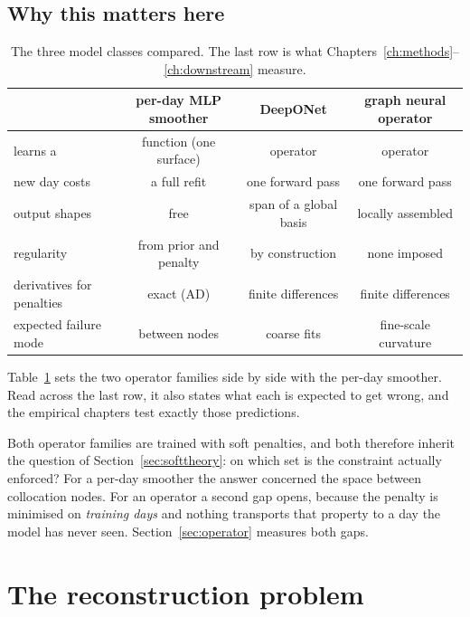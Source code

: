 \subsection{Why this matters here}

\begin{table}[htbp]\centering\small
\caption{The three model classes compared. The last row is what
Chapters~\ref{ch:methods}--\ref{ch:downstream} measure.}\label{tab:opcompare}
\begin{tabular}{lccc}
\toprule
 & per-day MLP smoother & DeepONet & graph neural operator \\
\midrule
learns a & function (one surface) & operator & operator \\
new day costs & a full refit & one forward pass & one forward pass \\
output shapes & free & span of a global basis & locally assembled \\
regularity & from prior and penalty & by construction & none imposed \\
derivatives for penalties & exact (AD) & finite differences & finite differences \\
expected failure mode & between nodes & coarse fits & fine-scale curvature \\
\bottomrule
\end{tabular}
\end{table}

Table~\ref{tab:opcompare} sets the two operator families side by side with the per-day smoother.
Read across the last row, it also states what each is expected to get wrong, and the empirical
chapters test exactly those predictions.

Both operator families are trained with soft penalties, and both therefore inherit the question
of Section~\ref{sec:softtheory}: on which set is the constraint actually enforced? For a per-day
smoother the answer concerned the space between collocation nodes. For an operator a second gap
opens, because the penalty is minimised on \emph{training days} and nothing transports that
property to a day the model has never seen. Section~\ref{sec:operator} measures both gaps.

\section{The reconstruction problem}\label{sec:problem}

